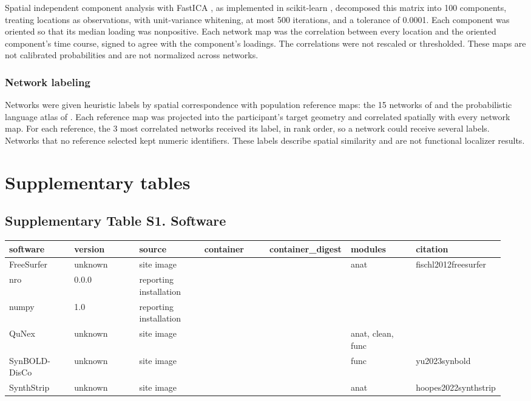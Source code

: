 Spatial independent component analysis with FastICA \citep{hyvarinen1999fastica}, as implemented in scikit-learn \citep{pedregosa2011sklearn}, decomposed this matrix into 100 components, treating locations as observations, with unit-variance whitening, at most 500 iterations, and a tolerance of 0.0001. Each component was oriented so that its median loading was nonpositive. Each network map was the correlation between every location and the oriented component's time course, signed to agree with the component's loadings. The correlations were not rescaled or thresholded. These maps are not calibrated probabilities and are not normalized across networks.

\subsubsection*{Network labeling}

Networks were given heuristic labels by spatial correspondence with population reference maps: the 15 networks of \citet{du2024organization} and the probabilistic language atlas of \citet{lipkin2022probabilistic}. Each reference map was projected into the participant's target geometry and correlated spatially with every network map. For each reference, the 3 most correlated networks received its label, in rank order, so a network could receive several labels. Networks that no reference selected kept numeric identifiers. These labels describe spatial similarity and are not functional localizer results.

\section*{Supplementary tables}

\subsection*{Supplementary Table S1. Software}
{\scriptsize
\begin{longtable}{p{0.136\linewidth}p{0.136\linewidth}p{0.136\linewidth}p{0.136\linewidth}p{0.136\linewidth}p{0.136\linewidth}p{0.136\linewidth}}
\hline
\textbf{software} & \textbf{version} & \textbf{source} & \textbf{container} & \textbf{container\_digest} & \textbf{modules} & \textbf{citation} \\
\hline
\endhead
FreeSurfer & unknown & site image &  &  & anat & fischl2012freesurfer \\
nro & 0.0.0 & reporting installation &  &  &  &  \\
numpy & 1.0 & reporting installation &  &  &  &  \\
QuNex & unknown & site image &  &  & anat, clean, func &  \\
SynBOLD-DisCo & unknown & site image &  &  & func & yu2023synbold \\
SynthStrip & unknown & site image &  &  & anat & hoopes2022synthstrip \\
\hline
\end{longtable}
}

